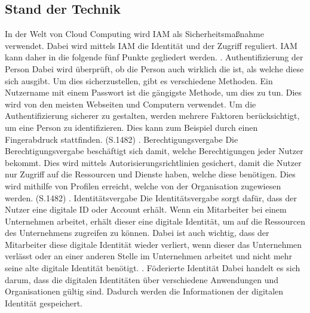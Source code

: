 \subsection{Stand der Technik}
\label{sec:chapter04:Stand}
In der Welt von Cloud Computing wird \ac{IAM} als Sicherheitsmaßnahme verwendet.
Dabei wird mittels \ac{IAM} die Identität und der Zugriff reguliert.
\ac{IAM} kann daher in die folgende fünf Punkte gegliedert werden.
\newline
{}. Authentifizierung der Person
\newline
Dabei wird überprüft, ob die Person auch wirklich die ist, als welche diese sich ausgibt.
Um dies sicherzustellen, gibt es verschiedene Methoden.
Ein Nutzername mit einem Passwort ist die gängigste Methode, um dies zu tun. Dies wird von den meisten Webseiten und Computern verwendet.
Um die Authentifizierung sicherer zu gestalten, werden mehrere Faktoren berücksichtigt, um eine Person zu identifizieren.
Dies kann zum Beispiel durch einen Fingerabdruck stattfinden. \cite{IamIEEE} (S.1482)
\newline
{}. Berechtigungsvergabe
\newline
Die Berechtigungsvergabe beschäftigt sich damit, welche Berechtigungen jeder Nutzer bekommt.
Dies wird mittels Autorisierungsrichtlinien gesichert, damit die Nutzer nur Zugriff auf die Ressourcen und Dienste haben, welche diese benötigen.
Dies wird mithilfe von Profilen erreicht, welche von der Organisation zugewiesen werden. \cite{IamIEEE} (S.1482)
\newline
{}. Identitätsvergabe
\newline
Die Identitätsvergabe sorgt dafür, dass der Nutzer eine digitale ID oder Account erhält.
Wenn ein Mitarbeiter bei einem Unternehmen arbeitet, erhält dieser eine digitale Identität, um auf die Ressourcen des Unternehmens zugreifen zu können.
Dabei ist auch wichtig, dass der Mitarbeiter diese digitale Identität wieder verliert, wenn dieser das Unternehmen verlässt oder an einer anderen Stelle im Unternehmen arbeitet und nicht mehr seine alte digitale Identität benötigt.
\newline
{}. Föderierte Identität
\newline
Dabei handelt es sich darum, dass die digitalen Identitäten über verschiedene Anwendungen und Organisationen gültig sind.
Dadurch werden die Informationen der digitalen Identität gespeichert.
